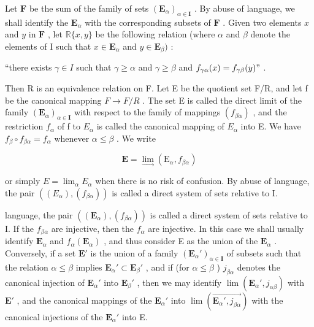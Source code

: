 Let \(\mathbf{F}\) be the sum of the family of sets \((\mathbf{E}_{\alpha})_{\alpha \in \mathbf{I}}\) . By abuse of language, we shall identify the \(\mathbf{E}_{\alpha}\) with the corresponding subsets of \(\mathbf{F}\) . Given two elements \(x\) and \(y\) in \(\mathbf{F}\) , let \(\mathbb{R}\{x, y\}\) be the following relation (where \(\alpha\) and \(\beta\) denote the elements of I such that \(x \in \mathbf{E}_{\alpha}\) and \(y \in \mathbf{E}_{\beta})\) :

``there exists \(\gamma \in I\) such that \(\gamma \geqslant \alpha\) and \(\gamma \geqslant \beta\) and \(f_{\gamma \alpha}(x) = f_{\gamma \beta}(y) "\) .

Then R is an equivalence relation on F. Let E be the quotient set F/R, and let f be the canonical mapping \(F \rightarrow F/R\) . The set E is called the direct limit of the family \((\mathbf{E}_{\alpha})_{\alpha \in \mathbf{I}}\) with respect to the family of mappings \((f_{\beta\alpha})\) , and the restriction \(f_{\alpha}\) of f to \(E_{\alpha}\) is called the canonical mapping of \(E_{\alpha}\) into E. We have \(f_{\beta} \circ f_{\beta\alpha} = f_{\alpha}\) whenever \(\alpha \leqslant \beta\) . We write

\[
\mathbf {E} = \lim _ {\rightarrow} (\mathrm{E} _ {\alpha}, f _ {\beta \alpha})
\]

or simply \(E = \lim_{\alpha} E_{\alpha}\) when there is no risk of confusion. By abuse of language, the pair \(((E_{\alpha}), (f_{\beta\alpha}))\) is called a direct system of sets relative to I.

language, the pair \(((\mathbf{E}_{\alpha}), (f_{\beta \alpha}))\) is called a direct system of sets relative to I. If the \(f_{\beta \alpha}\) are injective, then the \(f_{\alpha}\) are injective. In this case we shall usually identify \(\mathbf{E}_{\alpha}\) and \(f_{\alpha}(\mathbf{E}_{\alpha})\) , and thus consider E as the union of the \(\mathbf{E}_{\alpha}\) . Conversely, if a set \(\mathbf{E}'\) is the union of a family \((\mathbf{E}_{\alpha}')_{\alpha \in \mathbf{I}}\) of subsets such that the relation \(\alpha \leqslant \beta\) implies \(\mathbf{E}_{\alpha}' \subset \mathbf{E}_{\beta}'\) , and if (for \(\alpha \leqslant \beta\) ) \(j_{\beta \alpha}\) denotes the canonical injection of \(\mathbf{E}_{\alpha}'\) into \(\mathbf{E}_{\beta}'\) , then we may identify \(\lim (\mathbf{E}_{\alpha}', j_{\alpha \beta})\) with \(\mathbf{E}'\) , and the canonical mappings of the \(\mathbf{E}_{\alpha}'\) into \(\lim (\overrightarrow{\mathbf{E}_{\alpha}', j_{\beta \alpha}})\) with the canonical injections of the \(\mathbf{E}_{\alpha}'\) into E.

